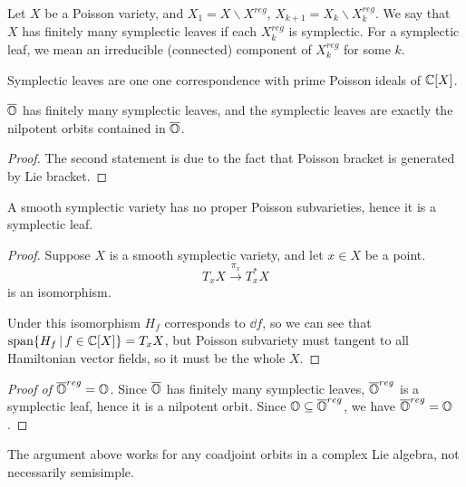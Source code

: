 \documentclass[12pt]{amsart}
\numberwithin{equation}{section}
\renewcommand{\bar}{\overline}
\newcommand{\set}[2]{\{#1\,|\,#2\}}
\begin{document}
Let $X$ be a Poisson variety, and $X_1 = X \backslash X^{reg}$, $X_{k+1} = X_k \backslash X_k^{reg}$. We say that $X$ has finitely many symplectic leaves if each $X_k^{reg}$ is symplectic. For a symplectic leaf, we mean an irreducible (connected) component of $X_k^{reg}$ for some $k$.

\begin{lem}
  Symplectic leaves are one one correspondence with prime Poisson ideals of ${\mathbb {C}}[X]$.
\end{lem}

\begin{lem}
  $\bar{\BO}$ has finitely many symplectic leaves, and the symplectic leaves are exactly the nilpotent orbits contained in $\bar{\BO}$.
\end{lem}

\begin{proof}
  The second statement is due to the fact that Poisson bracket is generated by Lie bracket.
\end{proof}

\begin{lem}
  A smooth symplectic variety has no proper Poisson subvarieties, hence it is a symplectic leaf.
\end{lem}

\begin{proof}
  Suppose $X$ is a smooth symplectic variety, and let $x \in X$ be a point. 
  $$T_x X \xrightarrow{\pi_x} T_x^* X$$
  is an isomorphism.

  Under this isomorphism $H_f$ corresponds to $\dd f$, so we can see that $\mathrm{span}\set{H_f}{f \in \BC[X]} = T_x X$, but Poisson subvariety must tangent to all Hamiltonian vector fields, so it must be the whole $X$.
\end{proof}


\begin{proof}[Proof of $\bar{\BO}^{reg} = \BO$]
  Since $\bar{\BO}$ has finitely many symplectic leaves, $\bar{\BO}^{reg}$ is a symplectic leaf, hence it is a nilpotent orbit. Since $\BO \subseteq \bar{\BO}^{reg}$, we have $\bar{\BO}^{reg} = \BO$.
\end{proof}



\begin{rk}
  The argument above works for any coadjoint orbits in a complex Lie algebra, not necessarily semisimple.
\end{rk}
\end{document}
